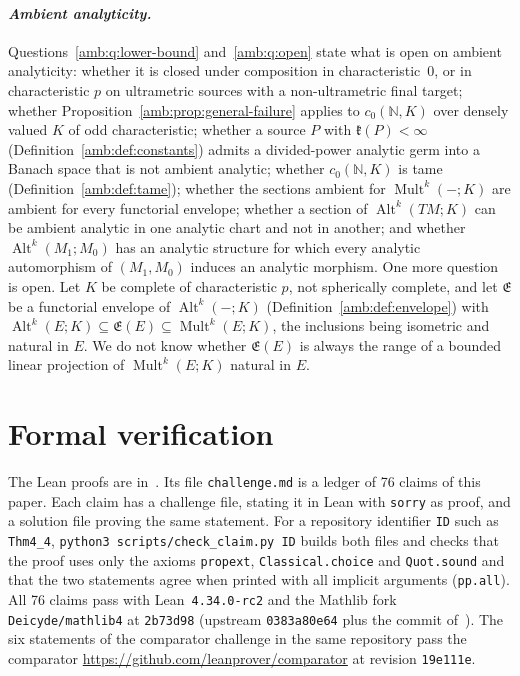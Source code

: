 \documentclass[11pt]{amsart}
\theoremstyle{definition}
\theoremstyle{remark}
\numberwithin{equation}{section}
\newcommand{\N}{\mathbb N}
\newcommand{\Alt}{\operatorname{Alt}}
\newcommand{\Mult}{\operatorname{Mult}}
\theoremstyle{plain}
\theoremstyle{definition}
\theoremstyle{plain}
\begin{document}
\paragraph{\textit{Ambient analyticity.}}
Questions~\ref{amb:q:lower-bound} and~\ref{amb:q:open} state what is open on ambient analyticity:
whether it is closed under composition in characteristic~$0$, or in characteristic $p$ on ultrametric sources with a
non-ultrametric final target; whether Proposition~\ref{amb:prop:general-failure} applies to $c_0(\N,K)$ over densely valued
$K$ of odd characteristic; whether a source $P$ with $\mathfrak k(P)<\infty$ (Definition~\ref{amb:def:constants}) admits a
divided-power analytic germ into a Banach space that is not ambient analytic; whether $c_0(\N,K)$ is tame
(Definition~\ref{amb:def:tame}); whether the sections ambient for $\Mult^k(-;K)$ are ambient for every functorial envelope;
whether a section of $\Alt^k(TM;K)$ can be ambient analytic in one analytic chart and not in another;
and whether $\Alt^k(M_1;M_0)$ has an analytic structure for which every analytic automorphism of $(M_1,M_0)$ induces an
analytic morphism. One more question is open. Let $K$ be complete of characteristic $p$, not spherically complete, and let $\mathfrak E$ be a functorial
envelope of $\Alt^k(-;K)$ (Definition~\ref{amb:def:envelope}) with $\Alt^k(E;K)\subseteq\mathfrak E(E)\subseteq\Mult^k(E;K)$,
the inclusions being isometric and natural in $E$. We do not know whether $\mathfrak E(E)$ is always the range of a bounded
linear projection of $\Mult^k(E;K)$ natural in $E$.
\section{Formal verification}\label{sec:verification}

The Lean proofs are in~\cite{LeanP}. Its file \texttt{challenge.md} is a ledger of 76 claims of this paper. Each claim
has a challenge file, stating it in Lean with \texttt{sorry} as proof, and a solution file proving the same statement.
For a repository identifier \texttt{ID} such as \texttt{Thm4\_4}, \texttt{python3 scripts/check\_claim.py ID} builds
both files and checks that the proof uses only the axioms \texttt{propext}, \texttt{Classical.choice} and
\texttt{Quot.sound} and that the two statements agree when printed with all implicit arguments (\texttt{pp.all}). All 76
claims pass with Lean~\texttt{4.34.0-rc2} and the Mathlib fork \texttt{Deicyde/mathlib4} at \texttt{2b73d98}
(upstream \texttt{0383a80e64} plus the commit of~\cite{PR}). The six statements of the comparator challenge in the
same repository pass the comparator \url{https://github.com/leanprover/comparator} at revision \texttt{19e111e}.
\end{document}
